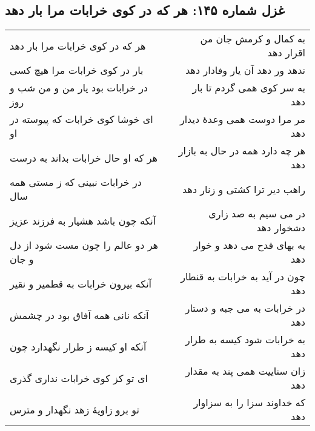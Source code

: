 \begin{center}
\section*{غزل شماره ۱۴۵: هر که در کوی خرابات مرا بار دهد}
\label{sec:145}
\begin{longtable}{l p{0.5cm} r}
هر که در کوی خرابات مرا بار دهد
&&
به کمال و کرمش جان من اقرار دهد
\\
بار در کوی خرابات مرا هیچ کسی
&&
ندهد ور دهد آن یار وفادار دهد
\\
در خرابات بود یار من و من شب و روز
&&
به سر کوی همی گردم تا بار دهد
\\
ای خوشا کوی خرابات که پیوسته در او
&&
مر مرا دوست همی وعدهٔ دیدار دهد
\\
هر که او حال خرابات بداند به درست
&&
هر چه دارد همه در حال به بازار دهد
\\
در خرابات نبینی که ز مستی همه سال
&&
راهب دیر ترا کشتی و زنار دهد
\\
آنکه چون باشد هشیار به فرزند عزیز
&&
در می سیم به صد زاری دشخوار دهد
\\
هر دو عالم را چون مست شود از دل و جان
&&
به بهای قدح می دهد و خوار دهد
\\
آنکه بیرون خرابات به قطمیر و نقیر
&&
چون در آید به خرابات به قنطار دهد
\\
آنکه نانی همه آفاق بود در چشمش
&&
در خرابات به می جبه و دستار دهد
\\
آنکه او کیسه ز طرار نگهدارد چون
&&
به خرابات شود کیسه به طرار دهد
\\
ای تو کز کوی خرابات نداری گذری
&&
زان سناییت همی پند به مقدار دهد
\\
تو برو زاویهٔ زهد نگهدار و مترس
&&
که خداوند سزا را به سزاوار دهد
\\
\end{longtable}
\end{center}
